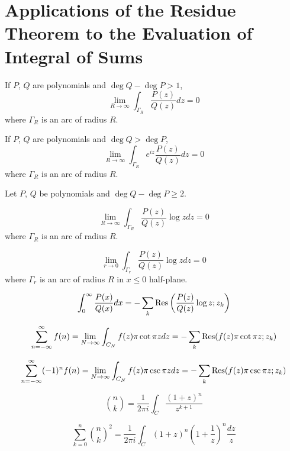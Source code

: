 \documentclass{article}
\begin{document}
\section{Applications of the Residue Theorem to the Evaluation of Integral of Sums}

\begin{proposition}
  If \(P\), \(Q\) are polynomials and \(\deg Q - \deg P > 1\),
  \[\lim_{R \to \infty} \int_{\Gamma_R} \frac{P(z)}{Q(z)} dz = 0\]
  where \(\Gamma_R\) is an arc of radius \(R\).
\end{proposition}

\begin{proposition}
  If \(P\), \(Q\) are polynomials and \(\deg Q > \deg P\),
  \[\lim_{R \to \infty} \int_{\Gamma_R} e^{iz} \frac{P(z)}{Q(z)} dz = 0\]
  where \(\Gamma_R\) is an arc of radius \(R\).
\end{proposition}

\begin{proposition}
  Let \(P\), \(Q\) be polynomials and \(\deg Q - \deg P \ge 2\).

  \[\lim_{R \to \infty} \int_{\Gamma_R} \frac{P(z)}{Q(z)} \log z dz = 0\]
  where \(\Gamma_R\) is an arc of radius \(R\).

  \[\lim_{r \to 0} \int_{\Gamma_r} \frac{P(z)}{Q(z)} \log z dz = 0\]
  where \(\Gamma_r\) is an arc of radius \(R\) in \(x \le 0\) half-plane.

  \[\int_0^\infty \frac{P(x)}{Q(x)} dx = - \sum_k \operatorname{Res}\left(\frac{P(z)}{Q(z)} \log z; z_k\right)\]
\end{proposition}

\begin{proposition}
  \[\sum_{n=-\infty}^{\infty} f(n) = \lim_{N \to \infty} \int_{C_N} f(z) \pi \cot \pi z dz = -\sum_k \operatorname{Res}(f(z)\pi\cot\pi z; z_k)\]
\end{proposition}
\begin{proposition}
  \[\sum_{n=-\infty}^{\infty} (-1)^n f(n) = \lim_{N \to \infty} \int_{C_N} f(z) \pi \csc \pi z dz = -\sum_k \operatorname{Res}(f(z)\pi\csc\pi z; z_k)\]
\end{proposition}

\begin{proposition}
  \[{n \choose k} = \frac{1}{2\pi i} \int_C \frac{(1+z)^n}{z^{k+1}}\]
\end{proposition}
\begin{proposition}
  \[\sum_{k=0}^n {n \choose k}^2 =
  \frac{1}{2\pi i}\int_C (1+z)^n\left(1+\frac{1}{z}\right)^n \frac{dz}{z}\]
\end{proposition}
\end{document}
